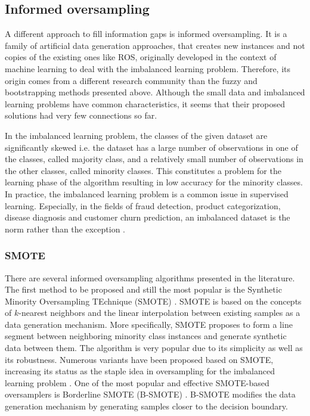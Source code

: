 \documentclass[parskip=full]{scrartcl}
\begin{document}
\subsection{Informed oversampling}

A different approach to fill information gaps is informed oversampling. It is a family of artificial data generation approaches, that creates new instances and not copies of the existing ones like ROS, originally developed in the context of machine learning to deal with the imbalanced learning problem. Therefore, its origin comes from a different research community than the fuzzy and bootstrapping methods presented above. Although the small data and imbalanced learning problems have common characteristics, it seems that their proposed solutions had very few connections so far.

In the imbalanced learning problem, the classes of the given dataset are significantly skewed i.e. the dataset has a large number of observations in one of the classes, called majority class, and a relatively small number of observations in the other classes, called minority classes. This constitutes a problem for the learning phase of the algorithm resulting in low accuracy for the minority classes. In practice, the imbalanced learning problem is a common issue in supervised learning. Especially, in the fields of fraud detection, product categorization, disease diagnosis and customer churn prediction, an imbalanced dataset is the norm rather than the exception \cite{He.2013,Chen.2012,Verbeke.2012}.

\subsubsection{SMOTE}

There are several informed oversampling algorithms presented in the literature. The first method to be  proposed and still the most popular is the Synthetic Minority Oversampling TEchnique (SMOTE) \cite{Chawla.2002}. SMOTE is based on the concepts of \( k \)-nearest neighbors and the linear interpolation between existing samples as a data generation mechanism. More specifically, SMOTE proposes to form a line segment between neighboring minority class instances and generate synthetic data between them. The algorithm is very popular due to its simplicity as well as its robustness. Numerous variants have been proposed based on SMOTE, increasing its status as the staple idea in oversampling for the imbalanced learning problem \cite{Fernandez.2018}. One of the most popular and effective SMOTE-based oversamplers is Borderline SMOTE (B-SMOTE) \cite{Han.2005}. B-SMOTE modifies the data generation mechanism by generating
samples closer to the decision boundary.
\end{document}
